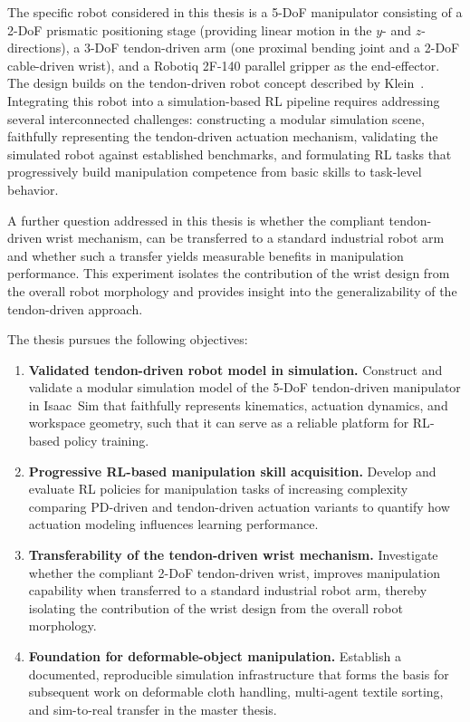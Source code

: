 The specific robot considered in this thesis is a 5-\ac{DoF} manipulator consisting of a 2-\ac{DoF} prismatic positioning stage (providing linear motion in the $y$- and $z$-directions), a 3-\ac{DoF} tendon-driven arm (one proximal bending joint and a 2-\ac{DoF} cable-driven wrist), and a Robotiq 2F-140 parallel gripper as the end-effector. The design builds on the tendon-driven robot concept described by Klein~\cite{Klein2023}. Integrating this robot into a simulation-based \ac{RL} pipeline requires addressing several interconnected challenges: constructing a modular simulation scene, faithfully representing the tendon-driven actuation mechanism, validating the simulated robot against established benchmarks, and formulating \ac{RL} tasks that progressively build manipulation competence from basic skills to task-level behavior.

A further question addressed in this thesis is whether the compliant tendon-driven wrist mechanism, can be transferred to a standard industrial robot arm and whether such a transfer yields measurable benefits in manipulation performance. This experiment isolates the contribution of the wrist design from the overall robot morphology and provides insight into the generalizability of the tendon-driven approach.

The thesis pursues the following objectives:

\begin{enumerate}
  \item \textbf{Validated tendon-driven robot model in simulation.}
  Construct and validate a modular simulation model of the 5-\ac{DoF} tendon-driven manipulator in Isaac~Sim that faithfully represents kinematics, actuation dynamics, and workspace geometry, such that it can serve as a reliable platform for \ac{RL}-based policy training.

  \item \textbf{Progressive \ac{RL}-based manipulation skill acquisition.}
  Develop and evaluate \ac{RL} policies for manipulation tasks of increasing complexity comparing \ac{PD}-driven and tendon-driven actuation variants to quantify how actuation modeling influences learning performance.

  \item \textbf{Transferability of the tendon-driven wrist mechanism.}
  Investigate whether the compliant 2-\ac{DoF} tendon-driven wrist, improves manipulation capability when transferred to a standard industrial robot arm, thereby isolating the contribution of the wrist design from the overall robot morphology.

  \item \textbf{Foundation for deformable-object manipulation.}
  Establish a documented, reproducible simulation infrastructure that forms the basis for subsequent work on deformable cloth handling, multi-agent textile sorting, and sim-to-real transfer in the master thesis.
\end{enumerate}

